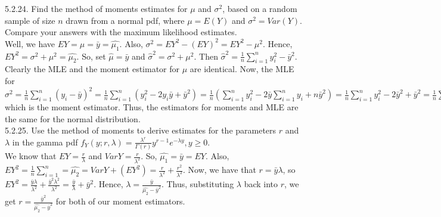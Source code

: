 \documentclass[12pt]{article}
\begin{document}
5.2.24. Find the method of moments estimates for $\mu$ and $\sigma^2$, based on a random sample of size $n$ drawn from a normal pdf, where $\mu=E(Y)$ and $\sigma^2=Var(Y)$. Compare your answers with the maximum likelihood estimates.\\
Well, we have $EY=\mu=\bar{y}=\hat{\mu_1}$. Also, $\sigma^2=EY^2-(EY)^2=EY^2-\mu^2$. Hence, $EY^2=\sigma^2+\mu^2=\hat{\mu_2}$. So, set $\hat{\mu}=\bar{y}$ and $\hat{\sigma}^2=\sigma^2+\mu^2$. Then $\hat{\sigma}^2=\frac1n\sum_{i=1}^ny_i^2-\bar{y}^2$. Clearly the MLE and the moment estimator for $\mu$ are identical. Now, the MLE for $\sigma^2=\frac1n\sum_{i=1}^n(y_i-\bar{y})^2=\frac1n\sum_{i=1}^n(y_i^2-2y_i\bar{y}+\bar{y}^2)=\frac1n(\sum_{i=1}^ny_i^2-2\bar{y}\sum_{i=1}^ny_i+n\bar{y}^2)=\frac1n\sum_{i=1}^ny_i^2-2\bar{y}^2+\bar{y}^2=\frac1n\sum_{i=1}^ny_i^2-\bar{y}^2$ which is the moment estimator. Thus, the estimators for moments and MLE are the same for the normal distribution.\\[20pt]

5.2.25. Use the method of moments to derive estimates for the parameters $r$ and $\lambda$ in the gamma pdf $f_Y(y;r,\lambda)=\frac{\lambda^r}{\Gamma(r)}y^{r-1}e^{-\lambda y}, y\geq0$.\\
We know that $EY=\frac{r}{\lambda}$ and $VarY=\frac{r}{\lambda^2}$. So, $\hat{\mu_1}=\bar{y}=EY$. Also, $EY^2=\frac1n\sum_{i=1}^n=\hat{\mu_2}=VarY+(EY^2)=\frac{r}{\lambda^2}+\frac{r^2}{\lambda^2}$. Now, we have that $r=\bar{y}\lambda$, so $EY^2=\frac{\bar{y}\lambda}{\lambda^2}+\frac{\bar{y}^2\lambda^2}{\lambda^2}=\frac{\bar{y}}{\lambda}+\bar{y}^2$. Hence, $\lambda=\frac{\bar{y}}{\hat{\mu_2}-\bar{y}^2}$. Thus, substituting $\lambda$ back into $r$, we get $r=\frac{\bar{y}^2}{\hat{\mu_2}-\bar{y}^2}$ for both of our moment estimators.\\[20pt]
\end{document}
